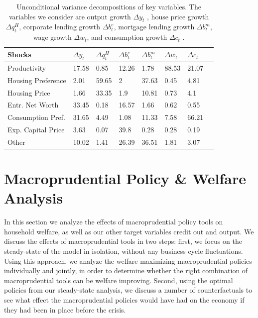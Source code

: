 \documentclass[12pt]{article}
\numberwithin{equation}{section}
\begin{document}
\begin{table}[H]
\caption{Unconditional variance decompositions of key variables. The variables we consider are output growth  $\Delta y_t$ , house price growth  $\Delta q^H_t$, corporate lending growth    $\Delta b^e_t$, mortgage lending growth    $\Delta b^m_t$, wage growth   $\Delta w_t$,  and consumption growth   $\Delta c_t$ . }
\label{uncond_var_decomp}
\begin{tabular}{l|lllllll}
Shocks& $\Delta y_t$ & $\Delta q^H_t$  & $\Delta b^e_t$  & $\Delta b^m_t$  & $\Delta w_t$   & $\Delta c_t$  &    \\
\hline
\hline
Productivity & 17.58 & 0.85 & 12.26 & 1.78 & 88.53 & 21.07 &  \\
Housing Preference & 2.01 & 59.65 & 2 & 37.63 & 0.45 &  4.81 &  \\
Housing Price & 1.66 & 33.35 & 1.9 & 10.81 & 0.73 & 4.1 &  \\
Entr. Net Worth & 33.45 & 0.18 & 16.57 & 1.66 & 0.62 &  0.55 &  \\
Consumption Pref. & 31.65 & 4.49 & 1.08 & 11.33 & 7.58 & 66.21 &  \\
Exp. Capital Price & 3.63 & 0.07 & 39.8 & 0.28 & 0.28 &  0.19 &  \\
Other & 10.02 & 1.41 & 26.39 & 36.51 & 1.81 & 3.07 & 
\end{tabular}
\end{table}

\FloatBarrier




\section{Macroprudential Policy \& Welfare Analysis}

In this section we analyze the effects of macroprudential policy tools on household welfare, as well as our other target variables credit out and output. We discuss the effects of macroprudential tools in two steps: first, we focus on the steady-state of the model in isolation, without any business cycle fluctuations. Using this approach, we analyze the welfare-maximizing macroprudential policies individually and jointly, in order to determine whether the right combination of macroprudential tools can be welfare improving. Second, using the optimal policies from our steady-state analysis, we discuss a number of counterfactuals to see what effect the macroprudential policies would have had on the economy if they had been in place before the crisis. 
\end{document}
